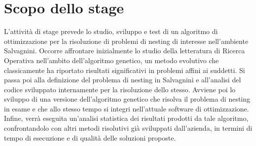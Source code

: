 \section{Scopo dello stage}

L’attività di stage prevede lo studio, sviluppo e test di un algoritmo di ottimizzazione per la risoluzione di problemi di nesting di interesse nell’ambiente Salvagnini.
Occorre affrontare inizialmente lo studio della letteratura di Ricerca Operativa nell’ambito dell’algoritmo genetico, un metodo evolutivo che classicamente ha riportato risultati significativi in problemi affini ai suddetti. Si passa poi alla definizione del problema di nesting in Salvagnini e all’analisi del codice sviluppato internamente per la risoluzione dello stesso. Avviene poi lo sviluppo di una versione dell’algoritmo genetico che risolva il problema di nesting in esame e che allo stesso tempo si integri nell’attuale software di ottimizzazione. Infine, verrà eseguita un’analisi statistica dei risultati prodotti da tale algoritmo, confrontandolo con altri metodi risolutivi già sviluppati dall’azienda, in termini di tempo di esecuzione e di qualità delle soluzioni proposte.


    
    
    
    
    


